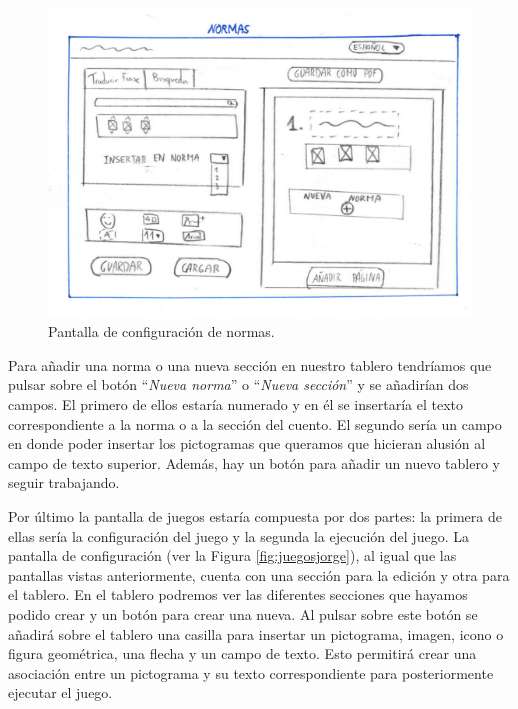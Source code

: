 	\begin{figure}[h!]
		\centering
		\includegraphics[width=0.7\linewidth]{Imagenes/Bitmap/normasJorge}
		\caption{Pantalla de configuración de normas.}
		\label{fig:normasjorge}
	\end{figure}


	
	Para añadir una norma o una nueva sección en nuestro tablero tendríamos que pulsar sobre el botón “\textit{Nueva norma}” o “\textit{Nueva sección}” y se añadirían dos campos. El primero de ellos estaría numerado y en él se insertaría el texto correspondiente a la norma o a la sección del cuento. El segundo sería un campo en donde poder insertar los pictogramas que queramos que hicieran alusión al campo de texto superior. Además, hay un botón para añadir un nuevo tablero y seguir trabajando.
	

	
	Por último la pantalla de juegos estaría compuesta por dos partes: la primera de ellas sería la configuración del juego y la segunda la ejecución del juego. La pantalla de configuración (ver la Figura \ref{fig:juegosjorge}), al igual que las pantallas vistas anteriormente, cuenta con una sección para la edición y otra para el tablero. En el tablero podremos ver las diferentes secciones que hayamos podido crear y un botón para crear una nueva. Al pulsar sobre este botón se añadirá sobre el tablero una casilla para insertar un pictograma, imagen, icono o figura geométrica, una flecha y un campo de texto. Esto permitirá crear una asociación entre un pictograma y su texto correspondiente para posteriormente ejecutar el juego.
	

